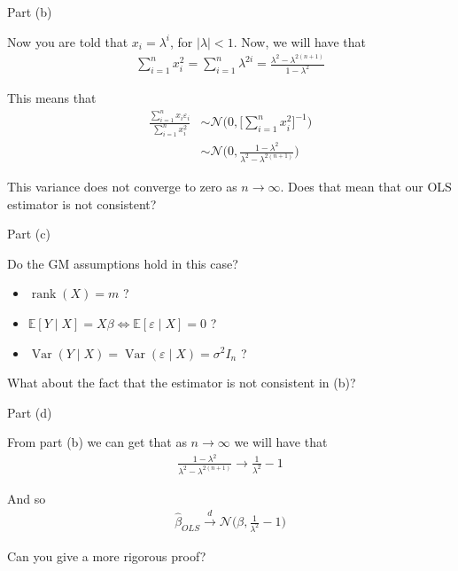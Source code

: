\begin{frame}{Part (b)}

   Now you are told that $x_i = \lambda^i$, for $\mid \lambda \mid < 1$. Now, we will have that
   \begin{align*}
       \sum_{i=1}^n x_i^2 = \sum_{i=1}^n \lambda^{2i} = \frac{\lambda^2 - \lambda^{2(n+1)}}{1 - \lambda^2}
   \end{align*}

   This means that
   \begin{align*}
       \frac{\sum_{i=1}^n x_i \varepsilon_i}{\sum_{i=1}^n x_i^2} &\sim \mathcal{N} \Biggr ( 0, \Biggr[ \sum_{i=1}^n x_i^2 \Biggr]^{-1} \Biggr)
       \\
       &\sim \mathcal{N} \Biggr( 0, \frac{1 - \lambda^2}{\lambda^2 - \lambda^{2(n+1)}} \Biggr)
   \end{align*}

   This variance does not converge to zero as $n \rightarrow \infty$. Does that mean that our OLS estimator is not consistent?
   
\end{frame}

\begin{frame}{Part (c)}

    Do the GM assumptions hold in this case?
    \begin{itemize}
        \item $\operatorname{rank}(X) = m$ ?
        \item $\mathbb{E}[Y \mid X] = X \beta \iff \mathbb{E}[\varepsilon \mid X] = 0$ ?
        \item $\operatorname{Var}(Y \mid X) = \operatorname{Var}(\varepsilon \mid X) = \sigma^2 I_n$ ?
    \end{itemize}

    What about the fact that the estimator is not consistent in (b)?

\end{frame}

\begin{frame}{Part (d)}

    From part (b) we can get that as $n \rightarrow \infty$ we will have that
    \begin{align*}
        \frac{1 - \lambda^2}{\lambda^2 - \lambda^{2(n+1)}} \rightarrow \frac{1}{\lambda^2} - 1
    \end{align*}

    And so
    \begin{align*}
        \hat{\beta}_{OLS} \xrightarrow{d} \mathcal{N} \Biggr( \beta, \frac{1}{\lambda^2} - 1 \Biggr) 
    \end{align*}

    Can you give a more rigorous proof?

\end{frame}